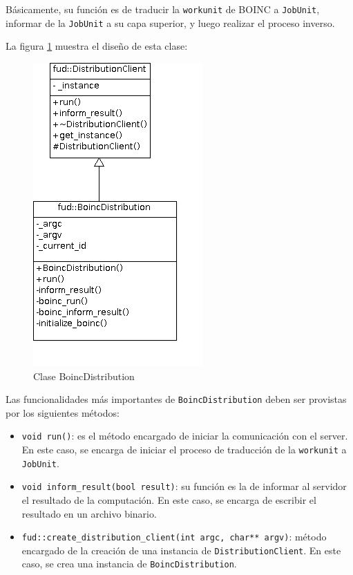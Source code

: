 Básicamente, su función es de traducir la \texttt{workunit} de BOINC a \texttt{JobUnit}, informar de la \texttt{JobUnit} a su capa superior, y luego realizar el proceso inverso.

La figura \ref{fig:BoincDistribution} muestra el diseño de esta clase:

\begin{figure}[H]
	\begin{center}
  		\includegraphics[scale=0.65]{images/BoincDistribution.png}
		\caption{Clase BoincDistribution}
		\label{fig:BoincDistribution}
	\end{center}
\end{figure}

Las funcionalidades más importantes de \texttt{BoincDistribution} deben ser provistas por los siguientes métodos:

\begin{itemize}
\item \texttt{void run()}: es el método encargado de iniciar la comunicación con el server. En este caso, se encarga de iniciar el proceso de traducción de la \texttt{workunit} a \texttt{JobUnit}.
\item \texttt{void inform\_result(bool result)}: su función es la de informar al servidor el resultado de la computación. En este caso, se encarga de escribir el resultado en un archivo binario.
\item \texttt{fud::create\_distribution\_client(int argc, char** argv)}: método encargado de la creación de una instancia de \texttt{DistributionClient}. En este caso, se crea una instancia de \texttt{BoincDistribution}.
\end{itemize}
